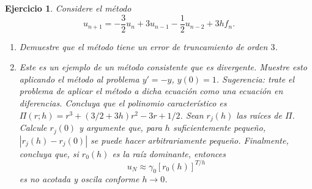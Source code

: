 \documentclass[11pt]{article}
\newtheorem{exercise}{Ejercicio}
\begin{document}
\begin{exercise}
  Considere el método
  \begin{equation}
    u_{n+1}
    = -\frac{3}{2}u_n + 3u_{n-1} - \frac{1}{2}u_{n-2} + 3hf_n
  .\end{equation}

  \begin{enumerate}
    \item
      Demuestre que el método tiene un error de truncamiento de orden
      $3$.
    \item
      Este es un ejemplo de un método consistente que es divergente.
      Muestre esto aplicando el método al problema $y'=-y$, $y(0)=1$.
      \emph{Sugerencia:} trate el problema de aplicar el método a
      dicha ecuación como una ecuación en diferencias. Concluya que el
      polinomio característico es $\Pi(r;h)=r^{3}+(3/2+3h)r^{2}-3r+1 /
      2$. Sean $r_j(h)$ las raíces de $\Pi$. Calcule $r_j(0)$ y
      argumente que, para $h$ suficientemente pequeño,
      $|r_j(h)-r_j(0)|$ se puede hacer arbitrariamente pequeño.
      Finalmente, concluya que, si $r_0(h)$ es la raíz dominante,
      entonces
      \begin{equation}
        u_N \approx \gamma_0[r_0(h)]^{T/h}
      \end{equation}
      es no acotada y oscila conforme $h\to 0$.
  \end{enumerate}
\end{exercise}
\end{document}

